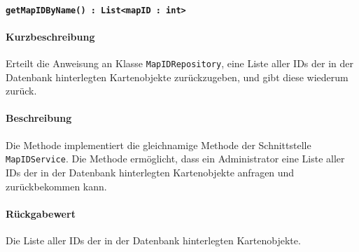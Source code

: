 \paragraph{\texttt{getMapIDByName() : List<mapID : int>}}%
\paragraph*{Kurzbeschreibung}
Erteilt die Anweisung an Klasse \texttt{MapIDRepository}, eine Liste aller IDs der in der Datenbank hinterlegten Kartenobjekte zurückzugeben, und gibt diese wiederum zurück.
\paragraph*{Beschreibung}
Die Methode implementiert die gleichnamige Methode der Schnittstelle \texttt{MapIDService}.
Die Methode ermöglicht, dass ein Administrator eine Liste aller IDs der in der Datenbank hinterlegten Kartenobjekte anfragen und zurückbekommen kann.
\paragraph*{Rückgabewert}
Die Liste aller IDs der in der Datenbank hinterlegten Kartenobjekte.
